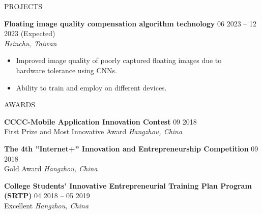 \documentclass{resume}
\begin{document}
\begin{rSection}{PROJECTS}
    \item \textbf{Floating image quality compensation algorithm technology} \hfill {06 2023 -- 12 2023 (Expected)}\\
    \mbox{} \hfill \textit{Hsinchu, Taiwan}
    \begin{itemize}
        \item Improved image quality of poorly captured floating images due to\\hardware tolerance using CNNs.
        \item Ability to train and employ on different devices.
    \end{itemize}
\end{rSection} 


\begin{rSection}{AWARDS}
\vspace{-1.25em}
    \item \textbf{CCCC-Mobile Application Innovation Contest} \hfill {09 2018}\\
    {First Prize and Most Innovative Award} \hfill \textit{Hangzhou, China}

    \item \textbf{The 4th ”Internet+” Innovation and Entrepreneurship Competition} \hfill {09 2018}\\
    {Gold Award} \hfill \textit{Hangzhou, China}

    \item \textbf{College Students’ Innovative Entrepreneurial Training Plan Program (SRTP)} \hfill {04 2018 – 05 2019}\\
    {Excellent} \hfill \textit{Hangzhou, China}
\end{rSection} 


\end{document}
